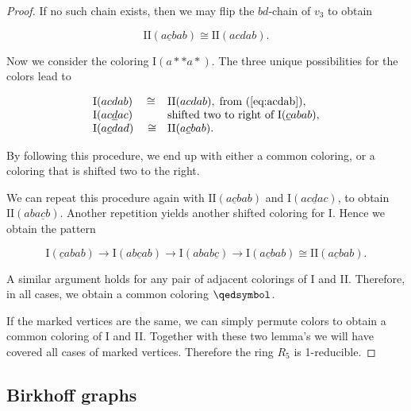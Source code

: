 \begin{proof}
If no such chain exists, then we may flip the $bd$-chain of $v_3$ to obtain

\begin{equation}
    \label{eq:acdab}
    \text{II}(a\underline{c}bab) \cong \text{II}(acdab).
\end{equation}

Now we consider the coloring $\text{I}(a{*}{*}a{*})$. The three unique possibilities for the colors lead to

\begin{equation*}
    \begin{matrix*}[l]
        \text{I}(acdab) \quad\cong& \text{II}(acdab), \;\text{from (\ref{eq:acdab})},\\
        \text{I}(ac\underline{d}ac) \; &\text{shifted two to right of $\text{I}(\underline{c}abab)$}, \\
        \text{I}(a\underline{c}dad) \quad\cong& \text{II}(a\underline{c}bab).
    \end{matrix*}
\end{equation*}

By following this procedure, we end up with either a common coloring, or a coloring that is shifted two to the right.

We can repeat this procedure again with $\text{II}(a\underline{c}bab)$ and $\text{I}(ac\underline{d}ac)$, to obtain $\text{II}(aba\underline{c}b)$. Another repetition yields another shifted coloring for I. Hence we obtain the pattern

\begin{equation}
    \text{I}(\underline{c}abab) \rightarrow \text{I}(ab\underline{c}ab) \rightarrow \text{I}(abab\underline{c}) \rightarrow \text{I}(a\underline{c}bab) \cong \text{II}(a\underline{c}bab).
\end{equation}

A similar argument holds for any pair of adjacent colorings of I and II. Therefore, in all cases, we obtain a common coloring $\qedsymbol$.

\vspace{1em}
If the marked vertices are the same, we can simply permute colors to obtain a common coloring of I and II. Together with these two lemma's we will have covered all cases of marked vertices. Therefore the ring $R_5$ is 1-reducible.

\end{proof}

\subsection{Birkhoff graphs}